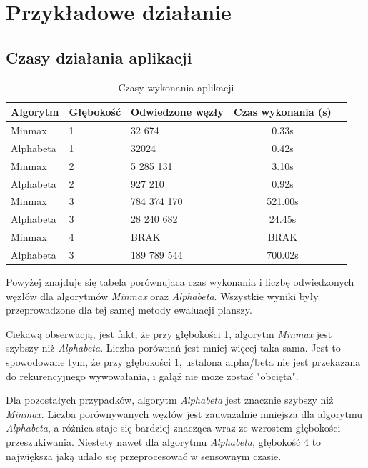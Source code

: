 \documentclass[a4paper, 12pt]{article}
\begin{document}
\section{Przykładowe działanie}
\subsection{Czasy działania aplikacji}

\begin{table}[h]
    \centering
    \caption{Czasy wykonania aplikacji}
    \begin{tabular}{|l|l|l|c|c|}
        \hline
        \textbf{Algorytm} & \textbf{Głębokość} & \textbf{Odwiedzone węzły} & \textbf{Czas wykonania (s)} \\
        \hline
         Minmax& 1 & 32 674 & 0.33s\\
         Alphabeta &1 & 32024 &  0.42s \\
         Minmax& 2 & 5 285 131 & 3.10s \\
         Alphabeta &2 & 927 210&  0.92s \\
         Minmax& 3& 784 374 170 & 521.00s \\
         Alphabeta &3 & 28 240 682 &  24.45s \\
         Minmax& 4 & BRAK & BRAK \\
         Alphabeta &3 & 189 789 544 &  700.02s \\
        \hline
    \end{tabular}
\end{table}
Powyżej znajduje się tabela porównujaca czas wykonania i liczbę 
odwiedzonych węzłów dla algorytmów \textit{Minmax} oraz \textit{Alphabeta}.
Wszystkie wyniki były przeprowadzone dla tej samej metody ewaluacji planszy.

Ciekawą obserwacją, jest fakt, że przy głębokości 1, algorytm \textit{Minmax}
jest szybszy niż \textit{Alphabeta}. Liczba porównań jest mniej więcej taka sama.
Jest to spowodowane tym, że przy głębokości 1, ustalona alpha/beta nie jest przekazana 
do rekurencyjnego wywowałania, i gałąź nie może zostać "obcięta".

Dla pozostałych przypadków, algorytm \textit{Alphabeta} jest znacznie szybszy niż \textit{Minmax}.
Liczba porównywanych węzłów jest zauważalnie mniejsza dla algorytmu \textit{Alphabeta}, 
a różnica staje się bardziej znacząca wraz ze wzrostem głębokości przeszukiwania.
Niestety nawet dla algorytmu \textit{Alphabeta}, głębokość 4 to największa jaką udało się przeprocesować
w sensownym czasie.
\end{document}
